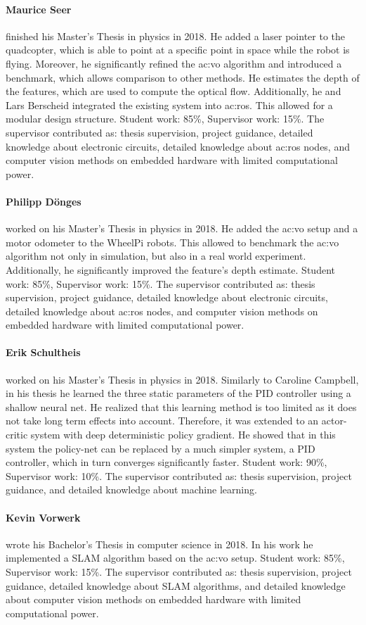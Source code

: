 \paragraph{Maurice Seer} finished his Master's Thesis in physics in 2018.
He added a laser pointer to the quadcopter, which is able to point at a specific point in space while the robot is flying.
Moreover, he significantly refined the \gls{ac:vo} algorithm and introduced a benchmark, which allows comparison to other methods.
He estimates the depth of the features, which are used to compute the optical flow.
Additionally, he and Lars Berscheid integrated the existing system into \gls{ac:ros}.
This allowed for a modular design structure.
Student work: 85\%, Supervisor work: 15\%.
The supervisor contributed as: thesis supervision, project guidance, detailed knowledge about electronic circuits, detailed knowledge about \gls{ac:ros} nodes, and computer vision methods on embedded hardware with limited computational power.

\paragraph{Philipp D\"onges} worked on his Master's Thesis in physics in 2018.
He added the \gls{ac:vo} setup and a motor odometer to the WheelPi robots.
This allowed to benchmark the \gls{ac:vo} algorithm not only in simulation, but also in a real world experiment.
Additionally, he significantly improved the feature's depth estimate.
Student work: 85\%, Supervisor work: 15\%.
The supervisor contributed as: thesis supervision, project guidance, detailed knowledge about electronic circuits, detailed knowledge about \gls{ac:ros} nodes, and computer vision methods on embedded hardware with limited computational power.

\paragraph{Erik Schultheis} worked on his Master's Thesis in physics in 2018.
Similarly to Caroline Campbell, in his thesis he learned the three static parameters of the PID controller using a shallow neural net.
He realized that this learning method is too limited as it does not take long term effects into account.
Therefore, it was extended to an actor-critic system with deep deterministic policy gradient.
He showed that in this system the policy-net can be replaced by a much simpler system, \ie a PID controller, which in turn converges significantly faster.
Student work: 90\%, Supervisor work: 10\%.
The supervisor contributed as: thesis supervision, project guidance, and detailed knowledge about machine learning.

\paragraph{Kevin Vorwerk} wrote his Bachelor's Thesis in computer science in 2018.
In his work he implemented a SLAM algorithm based on the \gls{ac:vo} setup.
Student work: 85\%, Supervisor work: 15\%.
The supervisor contributed as: thesis supervision, project guidance, detailed knowledge about SLAM algorithms, and detailed knowledge about computer vision methods on embedded hardware with limited computational power.
